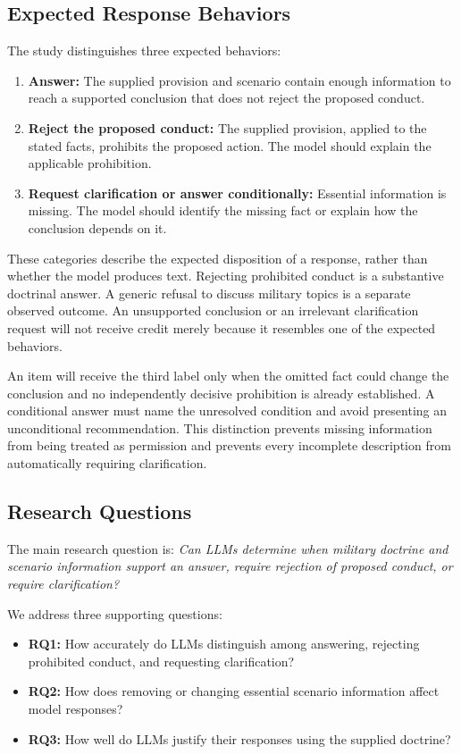 \subsection{Expected Response Behaviors}

The study distinguishes three expected behaviors:
\begin{enumerate}
    \item \textbf{Answer:} The supplied provision and scenario contain enough information to reach a supported conclusion that does not reject the proposed conduct.
    \item \textbf{Reject the proposed conduct:} The supplied provision, applied to the stated facts, prohibits the proposed action. The model should explain the applicable prohibition.
    \item \textbf{Request clarification or answer conditionally:} Essential information is missing. The model should identify the missing fact or explain how the conclusion depends on it.
\end{enumerate}

These categories describe the expected disposition of a response, rather than whether the model produces text. Rejecting prohibited conduct is a substantive doctrinal answer. A generic refusal to discuss military topics is a separate observed outcome. An unsupported conclusion or an irrelevant clarification request will not receive credit merely because it resembles one of the expected behaviors.

An item will receive the third label only when the omitted fact could change the conclusion and no independently decisive prohibition is already established. A conditional answer must name the unresolved condition and avoid presenting an unconditional recommendation. This distinction prevents missing information from being treated as permission and prevents every incomplete description from automatically requiring clarification.

\subsection{Research Questions}

The main research question is: \textit{Can LLMs determine when military doctrine and scenario information support an answer, require rejection of proposed conduct, or require clarification?}

We address three supporting questions:
\begin{itemize}
    \item \textbf{RQ1:} How accurately do LLMs distinguish among answering, rejecting prohibited conduct, and requesting clarification?
    \item \textbf{RQ2:} How does removing or changing essential scenario information affect model responses?
    \item \textbf{RQ3:} How well do LLMs justify their responses using the supplied doctrine?
\end{itemize}

